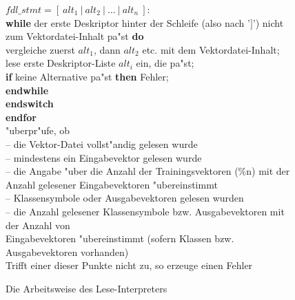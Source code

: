 \begin{figure}[ht]
{{{\hspace*{1cm} $fdl\_stmt = [\ alt_{1}\ |\ alt_{2}\ |\ \ldots\ |\ alt_{n}\ ]$: \\ 
\hspace*{2cm} {\bf while} der erste Deskriptor hinter der Schleife 
(also nach '$]$') nicht \\
\hspace*{2cm} zum Vektordatei-Inhalt pa"st {\bf do} \\
\hspace*{2.5cm} vergleiche zuerst $alt_1$, dann $alt_2$ etc. mit dem 
Vektordatei-Inhalt; \\ 
\hspace*{2.5cm} lese erste Deskriptor-Liste $alt_i$ ein, die pa"st; \\ 
\hspace*{2.5cm} {\bf if} keine Alternative pa"st {\bf then} Fehler; \\
\hspace*{2cm} {\bf endwhile} \\ 
\hspace*{0.5cm} {\bf endswitch} \\    
{\bf endfor} \\
"uberpr"ufe, ob \\
\hspace*{0.5cm} -- die Vektor-Datei vollst"andig gelesen wurde \\
\hspace*{0.5cm} -- mindestens ein Eingabevektor gelesen wurde \\
\hspace*{0.5cm} -- die Angabe "uber die Anzahl der Trainingsvektoren (\%n) mit
der \\
\hspace*{1cm} Anzahl gelesener Eingabevektoren "ubereinstimmt \\
\hspace*{0.5cm} -- Klassensymbole oder Ausgabevektoren gelesen wurden \\
\hspace*{0.5cm} -- die Anzahl gelesener Klassensymbole bzw. Ausgabevektoren
mit der Anzahl von \\ 
\hspace*{1cm} Eingabevektoren "ubereinstimmt 
(sofern Klassen bzw. Ausgabevektoren vorhanden) \\
Trifft einer dieser Punkte nicht zu, so erzeuge einen Fehler 
}}}
\caption{\label{lesen} Die Arbeitsweise des Lese-Interpreters}
\end{figure}

